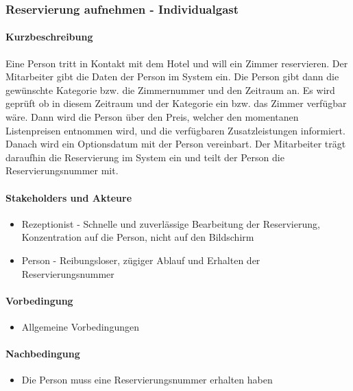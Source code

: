 \subsubsection{Reservierung aufnehmen - Individualgast}
\label{UseCase_ReservierungAufnehmenIndividualgast}

\paragraph{Kurzbeschreibung}
Eine Person tritt in Kontakt mit dem Hotel und will ein \Gls{Zimmer} reservieren. Der \Gls{Mitarbeiter} gibt die Daten der Person im System ein. Die Person gibt dann die gewünschte Kategorie bzw. die \Gls{Zimmernummer} und den Zeitraum an. Es wird geprüft ob in diesem Zeitraum und der Kategorie ein bzw. das \Gls{Zimmer} verfügbar wäre. Dann wird die Person über den Preis, welcher den momentanen Listenpreisen entnommen wird, und die verfügbaren \Gls{Zusatzleistung}en informiert. Danach wird ein \Gls{Optionsdatum} mit der Person vereinbart. Der \Gls{Mitarbeiter} trägt daraufhin die \Gls{Reservierung} im System ein und teilt der Person die \Gls{Reservierungsnummer} mit.

\paragraph{Stakeholders und Akteure}
\begin{itemize}
	\item \Gls{Rezeptionist} - Schnelle und zuverlässige Bearbeitung der
	\Gls{Reservierung}, Konzentration auf die Person, nicht auf den Bildschirm
	\item Person - Reibungsloser, zügiger Ablauf und Erhalten der \Gls{Reservierungsnummer}
\end{itemize}

\paragraph{Vorbedingung}
\begin{itemize}
	\item Allgemeine Vorbedingungen
\end{itemize}

\paragraph{Nachbedingung}
\begin{itemize}
	\item Die Person muss eine Reservierungsnummer erhalten haben
\end{itemize}

